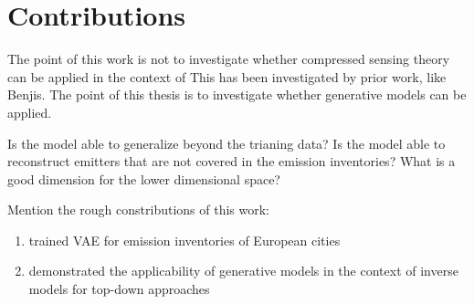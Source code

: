 
\section{Contributions}
The point of this work is not to investigate whether compressed sensing theory can be applied in the context of 
This has been investigated by prior work, like Benjis.
The point of this thesis is to investigate whether generative models can be applied.

Is the model able to generalize beyond the trianing data?
Is the model able to reconstruct emitters that are not covered in the emission inventories? 
What is a good dimension for the lower dimensional space?

Mention the rough constributions of this work:
\begin{enumerate}
    \item trained VAE for emission inventories of European cities
    \item demonstrated the applicability of generative models in the context of inverse models for top-down approaches
\end{enumerate}
